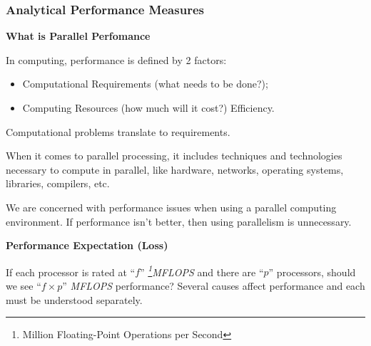 \subsubsection{Analytical Performance Measures}
\par{\large\textbf{What is Parallel Perfomance}}
\par In computing, performance is defined by 2 factors:
\begin{itemize}
    \item Computational Requirements (what needs to be done?);
    \item Computing Resources (how much will it cost?) Efficiency.
\end{itemize}
\par Computational problems translate to requirements.
\par When it comes to parallel processing, it includes techniques and technologies necessary to compute in parallel, like hardware, networks, operating systems, libraries, compilers, etc.
\par We are concerned with performance issues when using a parallel computing environment. If performance isn't better, then using parallelism is unnecessary.
\par{\large\textbf{Performance Expectation (Loss)}}
\par If each processor is rated at \enquote{$f$} \textit{\footnote{Million Floating-Point Operations per Second}{MFLOPS}} and there are \enquote{$p$} processors, should we see \enquote{$f\times p$} \textit{MFLOPS} performance? Several causes affect performance and each must be understood separately.
